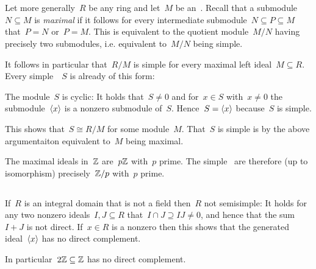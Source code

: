 \section{}





\subsection{}
\label{classification of simple modules}

Let more generally~$R$ be any ring and let~$M$ be an~{}.
Recall that a submodule~$N \subseteq M$ is \emph{maximal} if it follows for every intermediate submodule~$N \subseteq P \subseteq M$ that~$P= N$ or~$P = M$.
This is equivalent to the quotient module~$M/N$ having precisely two submodules, i.e. equivalent to~$M/N$ being simple.

It follows in particular that~$R/M$ is simple for every maximal left ideal~$M \subseteq R$.
Every simple~~$S$ is already of this form:

The module~$S$ is cyclic:
It holds that~$S \neq 0$ and for~$x \in S$ with~$x \neq 0$ the submodule~$\langle x\rangle$ is a nonzero submodule of~$S$.
Hence~$S = \langle x\rangle$ because~$S$ is simple.

This shows that~$S \cong R/M$ for some module~$M$.
That~$S$ is simple is by the above argumentaiton equivalent to~$M$ being maximal.

The maximal ideals in~$\Integer$ are~$p \mathbb{Z}$ with~$p$ prime.
The simple~{\modules{$\Integer$}} are therefore (up to isomorphism) precisely~$\mathbb{Z}/p$ with~$p$ prime.




\subsection{}

If~$R$ is an integral domain that is not a field then~$R$ not semisimple:
It holds for any two nonzero ideals~$I, J \subseteq R$ that~$I \cap J \supseteq IJ \neq 0$, and hence that the sum~$I + J$ is not direct.
If~$x \in R$ is a nonzero  then this shows that the generated ideal~$\langle x\rangle$ has no direct complement.

In particular~$2 \mathbb{Z} \subseteq \mathbb{Z}$ has no direct complement.





\subsection{}

